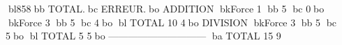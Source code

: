 bl858bb           TOTAL.bc      ERREUR.bo
ADDITION
bkForce      1     bb  5	bc        0bo
bkForce      3     bb  5	bc        4bo
bl TOTAL            10	        4bo
DIVISION
bkForce      3     bb  5	bc        5bo
bl TOTAL             5	        5bo
------------------------------
ba TOTAL            15	        9
